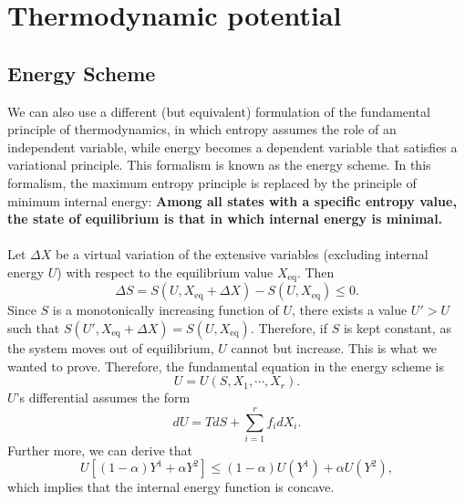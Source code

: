 \section{Thermodynamic potential}
\subsection{Energy Scheme}
We can also use a different (but equivalent) formulation of the fundamental principle of thermodynamics, in which entropy assumes the role of an independent variable, while energy becomes a dependent variable that satisfies a variational principle. This formalism is known as the energy scheme. In this formalism, the maximum entropy principle is replaced by the principle of minimum internal energy:
\textbf{Among all states with a specific entropy value, the state of equilibrium is that in which internal energy is minimal.}
\\ \\
Let $\Delta X$ be a virtual variation of the extensive variables (excluding internal energy $U$) with respect to the equilibrium value $X_{\mathrm{eq}}$. Then
\[\Delta S = S(U,X_{\mathrm{eq}} + \Delta X) - S(U,X_{\mathrm{eq}} ) \leq 0.\]
Since $S$ is a monotonically increasing function of $U$, there exists a value $U' > U$ such that $S(U',X_{\mathrm{eq}} + \Delta X) = S(U, X_{\mathrm{eq}})$. Therefore, if $S$ is kept constant, as the system moves out of equilibrium, $U$ cannot but increase. This is what we wanted to prove.
Therefore, the fundamental equation in the energy scheme is
\[U = U(S,X_1,\cdots,X_r).\]
$U$'s differential assumes the form
\[dU = TdS + \sum_{i=1}^r f_i dX_i.\]
Further more, we can derive that
\[ U[(1-\alpha)Y^1 + \alpha Y^2] \leq (1 - \alpha)U(Y^1) + \alpha U(Y^2) ,\]
which implies that the internal energy function is concave.


